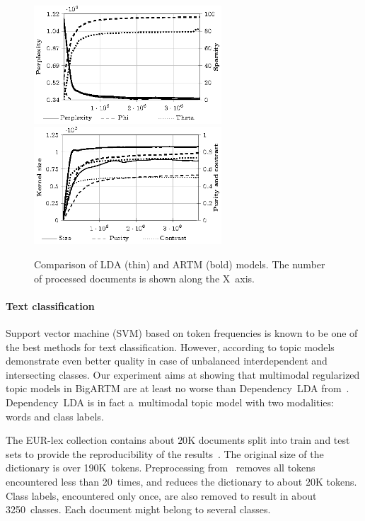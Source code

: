 \documentclass{acm_proc_article-sp}
\begin{document}
\begin{figure}[t]
    \centering
    \includegraphics[width=70mm]{plot_perplexity_sparsity.eps}\\
    \includegraphics[width=70mm]{plot_kernel.eps}
\caption{Comparison of LDA (thin) and ARTM (bold) models. The number of processed documents is shown along the X~axis.}
\label{fig:comparison_plot}
\end{figure}

\paragraph{Text classification}

Support vector machine (SVM) based on token frequencies is known to be one of the best methods for text classification.
However, according to \cite{rubin12statistical} topic models demonstrate even better quality in case of unbalanced interdependent and intersecting classes.
Our experiment aims at showing that multimodal regularized topic models in BigARTM are at least no worse than Dependency~LDA from~\cite{rubin12statistical}.
Dependency~LDA is in fact a~multimodal topic model with two modalities: words and class labels.

The EUR-lex collection contains about $20$K documents
split into train and test sets to provide the reproducibility of the results~\cite{rubin12statistical}.
The original size of the dictionary is over 190K~tokens.
Preprocessing from~\cite{rubin12statistical} removes all tokens encountered less than 20~times,
and reduces the dictionary to about $20$K tokens.
Class labels, encountered only once, are also removed to result in about 3250~classes.
Each document might belong to several classes.
\end{document}
